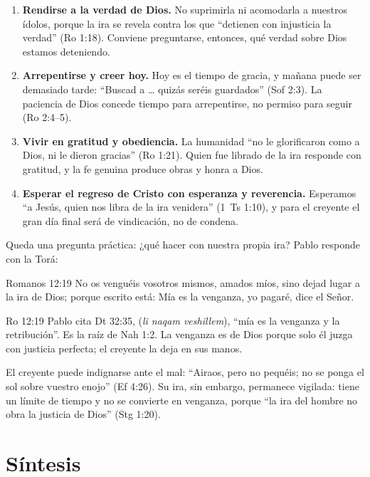 \begin{enumerate}
\item \textbf{Rendirse a la verdad de Dios.} No suprimirla ni acomodarla a nuestros ídolos, porque la ira se revela contra los que ``detienen con injusticia la verdad'' (Ro 1:18). Conviene preguntarse, entonces, qué verdad sobre Dios estamos deteniendo.
\item \textbf{Arrepentirse y creer hoy.} Hoy es el tiempo de gracia, y mañana puede ser demasiado tarde: ``Buscad a \SENOR{}\ldots{} quizás seréis guardados'' (Sof 2:3). La paciencia de Dios concede tiempo para arrepentirse, no permiso para seguir (Ro 2:4--5).
\item \textbf{Vivir en gratitud y obediencia.} La humanidad ``no le glorificaron como a Dios, ni le dieron gracias'' (Ro 1:21). Quien fue librado de la ira responde con gratitud, y la fe genuina produce obras y honra a Dios.
\item \textbf{Esperar el regreso de Cristo con esperanza y reverencia.} Esperamos ``a Jesús, quien nos libra de la ira venidera'' (1~Ts 1:10), y para el creyente el gran día final será de vindicación, no de condena.
\end{enumerate}

Queda una pregunta práctica: ¿qué hacer con nuestra propia ira? Pablo responde con la Torá:

\begin{verso}{Romanos 12:19}
No os venguéis vosotros mismos, amados míos, sino dejad lugar a la ira de Dios; porque escrito está: Mía es la venganza, yo pagaré, dice el Señor.
\end{verso}

\begin{filologiatexto}{Ro 12:19}
Pablo cita Dt 32:35,  (\emph{li naqam veshillem}), ``mía es la venganza y la retribución''. Es la raíz  de Nah 1:2. La venganza es de Dios porque solo él juzga con justicia perfecta; el creyente la deja en sus manos.
\end{filologiatexto}

El creyente puede indignarse ante el mal: ``Airaos, pero no pequéis; no se ponga el sol sobre vuestro enojo'' (Ef 4:26). Su ira, sin embargo, permanece vigilada: tiene un límite de tiempo y no se convierte en venganza, porque ``la ira del hombre no obra la justicia de Dios'' (Stg 1:20).

\section{Síntesis}

